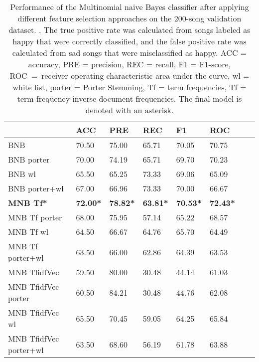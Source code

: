 \documentclass{article}
\begin{document}
\begin{table}[h]
  \caption{Performance of the Multinomial naive Bayes classifier after applying different feature selection approaches on the 200-song validation dataset. . The true positive rate was calculated from songs labeled as happy that were correctly classified, and the false positive rate was calculated from sad songs that were misclassified as happy. ACC = accuracy, PRE = precision, REC = recall, F1 = F1-score, \mbox{ROC = }receiver operating characteristic area under the curve, wl = white list, porter = Porter Stemming, Tf = term frequencies, Tf = term-frequency-inverse document frequencies. The final model is denoted with an asterisk.}
  
  \begin{tabular}[t]{| l  | l | l | l | l | l | l  |l |}
   \hline
     & ACC  & PRE &  REC & F1& ROC\\
   \hline
   \hline
BNB                         & 70.50    & 75.00    & 65.71    & 70.05   & 70.75        \\
BNB  porter                 & 70.00    & 74.19    & 65.71    & 69.70   & 70.23        \\
BNB  wl                     & 65.50    & 65.25    & 73.33    & 69.06   & 65.09        \\
BNB  porter+wl              & 67.00    & 66.96    & 73.33    & 70.00   & 66.67        \\
\textbf{MNB Tf*}              & \textbf{72.00*}    & \textbf{78.82*}    & \textbf{63.81*}    & \textbf{70.53*}   & \textbf{72.43*}        \\
MNB Tf porter        & 68.00    & 75.95    & 57.14    & 65.22   & 68.57        \\
MNB Tf wl            & 64.50    & 66.67    & 64.76    & 65.70   & 64.49        \\
MNB Tf porter+wl     & 63.50    & 66.00    & 62.86    & 64.39   & 63.53        \\
MNB TfidfVec               & 59.50    & 80.00    & 30.48    & 44.14   & 61.03        \\
MNB TfidfVec porter        & 60.50    & 84.21    & 30.48    & 44.76   & 62.08        \\
MNB TfidfVec wl            & 65.50    & 70.45    & 59.05    & 64.25   & 65.84        \\
MNB TfidfVec porter+wl     & 63.50    & 68.60    & 56.19    & 61.78   & 63.88       \\
   \hline
  \end{tabular}
\end{table}
\end{document}
